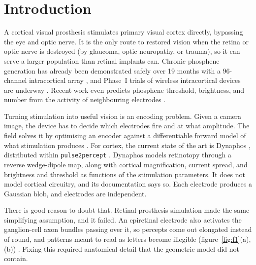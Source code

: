 \documentclass[10pt,twocolumn]{article}
\newcommand{\pptwo}{\texttt{pulse2percept}}
\begin{document}

\section{Introduction}

A cortical visual prosthesis stimulates primary visual cortex directly,
bypassing the eye and optic nerve. It is the only route to restored vision
when the retina or optic nerve is destroyed (by glaucoma, optic
neuropathy, or trauma), so it can serve a larger population than retinal
implants can. Chronic phosphene generation has already been demonstrated
safely over 19 months with a 96-channel intracortical array
\citep{fernandez2019,nct02983370}, and Phase~I trials of wireless
intracortical devices are underway \citep{nct04634383}. Recent work even
predicts phosphene threshold, brightness, and number from the activity of
neighbouring electrodes \citep{scienceadv2025}.

Turning stimulation into useful vision is an encoding problem. Given a
camera image, the device has to decide which electrodes fire and at what
amplitude. The field solves it by optimising an encoder against a
differentiable forward model of what stimulation produces
\citep{granley2022,deruyter2022,rl2022,e2e2025}. For cortex, the current
state of the art is Dynaphos \citep{vandergrinten2023}, distributed within
\pptwo{} \citep{beyeler}. Dynaphos models retinotopy through a reverse
wedge-dipole map, along with cortical magnification, current spread, and
brightness and threshold as functions of the stimulation parameters. It
does not model cortical circuitry, and its documentation says so. Each
electrode produces a Gaussian blob, and electrodes are independent.

There is good reason to doubt that. Retinal prosthesis simulation made the
same simplifying assumption, and it failed. An epiretinal electrode also
activates the ganglion-cell axon bundles passing over it, so percepts come
out elongated instead of round, and patterns meant to read as letters
become illegible (figure~\ref{fig:f1}(a),(b)) \citep{beyeler}. Fixing this
required anatomical detail that the geometric model did not contain.
\end{document}
